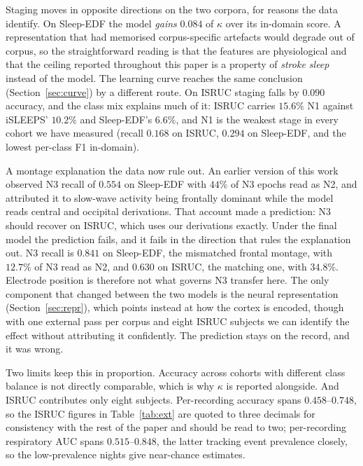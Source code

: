 \documentclass{ieeeaccess}
\begin{document}
Staging moves in opposite directions on the two corpora, for reasons the data
identify. On Sleep-EDF the model \emph{gains} $0.084$ of $\kappa$ over its in-domain
score. A representation that had memorised corpus-specific artefacts would degrade out of
corpus, so the straightforward reading is that the features are physiological and that the
ceiling reported throughout this paper is a property of \emph{stroke sleep} instead of
the model. The learning curve reaches the same conclusion (Section~\ref{sec:curve}) by a
different route. On ISRUC staging falls by $0.090$ accuracy, and the class mix explains
much of it: ISRUC carries $15.6\%$ N1 against iSLEEPS' $10.2\%$ and Sleep-EDF's $6.6\%$,
and N1 is the weakest stage in every cohort we have measured (recall $0.168$ on ISRUC,
$0.294$ on Sleep-EDF, and the lowest per-class F1 in-domain).

A montage explanation the data now rule out. An earlier version of this
work observed N3 recall of $0.554$ on Sleep-EDF with $44\%$ of N3 epochs read as N2, and
attributed it to slow-wave activity being frontally dominant while the model reads central
and occipital derivations. That account made a prediction: N3 should recover on ISRUC,
which uses our derivations exactly. Under the final model the prediction fails, and it
fails in the direction that rules the explanation out. N3 recall is $0.841$ on Sleep-EDF,
the mismatched frontal montage, with $12.7\%$ of N3 read as N2, and $0.630$ on ISRUC, the
matching one, with $34.8\%$. Electrode position is therefore not what governs N3 transfer
here. The only component that changed between the two models is the neural representation
(Section~\ref{sec:repr}), which points instead at how the cortex is encoded, though with
one external pass per corpus and eight ISRUC subjects we can identify the effect without
attributing it confidently. The prediction stays on the record, and it was wrong.

Two limits keep this in proportion. Accuracy across cohorts with different class balance is
not directly comparable, which is why $\kappa$ is reported alongside. And ISRUC contributes
only eight subjects. Per-recording accuracy spans $0.458$--$0.748$, so the ISRUC
figures in Table~\ref{tab:ext} are quoted to three decimals for consistency with the rest of
the paper and should be read to two; per-recording
respiratory AUC spans $0.515$--$0.848$, the latter tracking event prevalence closely, so
the low-prevalence nights give near-chance estimates.
\end{document}

